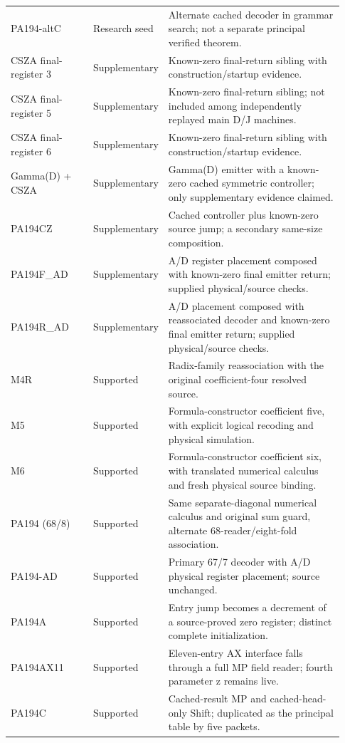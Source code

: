 \begin{longtable}{@{}p{0.25\linewidth}p{0.14\linewidth}p{0.54\linewidth}@{}}
PA194-\allowbreak{}altC & Research seed & Alternate cached decoder in grammar search; not a separate principal verified theorem. \\
CSZA final-\allowbreak{}register 3 & Supplementary & Known-zero final-return sibling with construction/startup evidence. \\
CSZA final-\allowbreak{}register 5 & Supplementary & Known-zero final-return sibling; not included among independently replayed main D/J machines. \\
CSZA final-\allowbreak{}register 6 & Supplementary & Known-zero final-return sibling with construction/startup evidence. \\
Gamma(D) + CSZA & Supplementary & Gamma(D) emitter with a known-zero cached symmetric controller; only supplementary evidence claimed. \\
PA194CZ & Supplementary & Cached controller plus known-zero source jump; a secondary same-size composition. \\
PA194F\_\allowbreak{}AD & Supplementary & A/D register placement composed with known-zero final emitter return; supplied physical/source checks. \\
PA194R\_\allowbreak{}AD & Supplementary & A/D placement composed with reassociated decoder and known-zero final emitter return; supplied physical/source checks. \\
M4R & Supported & Radix-family reassociation with the original coefficient-four resolved source. \\
M5 & Supported & Formula-constructor coefficient five, with explicit logical recoding and physical simulation. \\
M6 & Supported & Formula-constructor coefficient six, with translated numerical calculus and fresh physical source binding. \\
PA194 (68/8) & Supported & Same separate-diagonal numerical calculus and original sum guard, alternate 68-reader/eight-fold association. \\
PA194-\allowbreak{}AD & Supported & Primary 67/7 decoder with A/D physical register placement; source unchanged. \\
PA194A & Supported & Entry jump becomes a decrement of a source-proved zero register; distinct complete initialization. \\
PA194AX11 & Supported & Eleven-entry AX interface falls through a full MP field reader; fourth parameter z remains live. \\
PA194C & Supported & Cached-result MP and cached-head-only Shift; duplicated as the principal table by five packets. \\

\end{longtable}
